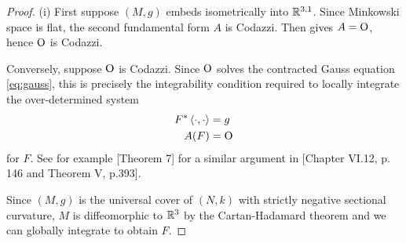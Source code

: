 \documentclass[a4paper,12pt]{amsart}
\begin{document}
\begin{proof}
(i) First suppose \((M, g)\) embeds isometrically into \(\mathbb{R}^{3,1}\). 
Since Minkowski space is flat, the second fundamental form \(A\) is Codazzi. Then  gives \(A = \operatorname{O}\), hence \(\operatorname{O}\) is Codazzi.

Conversely, suppose \(\operatorname{O}\) is Codazzi. Since $\operatorname{O}$ solves the contracted Gauss equation \eqref{eq:gauss}, this is precisely the integrability condition required to locally integrate the over-determined system
\begin{align*}
F^{\ast} \left\langle \cdot,\cdot \right\rangle &= g \\
A(F) &= \operatorname{O}
\end{align*}
for \(F\). See for example \cite{MR1713298}[Theorem 7] for a similar argument in \cite{MR1013365}[Chapter VI.12, p. 146 and Theorem V, p.393].

Since \((M, g)\) is the universal cover of \((N, k)\) with strictly negative sectional curvature, \(M\) is diffeomorphic to \(\mathbb{R}^3\) by the Cartan-Hadamard theorem and we can globally integrate to obtain \(F\).
\end{proof}

\end{document}
